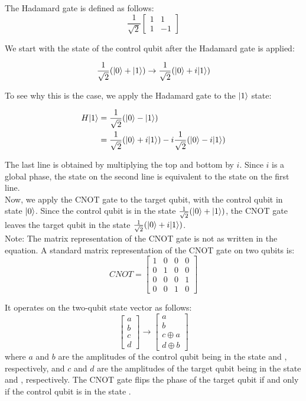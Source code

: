 \documentclass{article}
\begin{document}
	The Hadamard gate is defined as follows:
	\[
    \frac{1}{\sqrt{2}} \begin{bmatrix}
	1 & 1 \\
	1 & -1
	\end{bmatrix}
    \]

	We start with the state of the control qubit after the Hadamard gate is applied:
	
	\begin{align*}
		\frac{1}{\sqrt{2}}( |0\rangle  +  |1\rangle ) \rightarrow \frac{1}{\sqrt{2}}( |0\rangle  + i |1\rangle )
	\end{align*}
	
	To see why this is the case, we apply the Hadamard gate to the $ |1\rangle $ state:
	
	\begin{align*}
		H |1\rangle  &= \frac{1}{\sqrt{2}}( |0\rangle  -  |1\rangle ) \\
		&= \frac{1}{\sqrt{2}}( |0\rangle  + i |1\rangle ) - i\frac{1}{\sqrt{2}}( |0\rangle  - i |1\rangle )
	\end{align*}
	
	The last line is obtained by multiplying the top and bottom by $i$. Since $i$ is a global phase, the state on the second line is equivalent to the state on the first line. \\
	
	Now, we apply the CNOT gate to the target qubit, with the control qubit in state $ |0\rangle $. Since the control qubit is in the state $\frac{1}{\sqrt{2}}( |0\rangle  +  |1\rangle )$, the CNOT gate leaves the target qubit in the state $\frac{1}{\sqrt{2}}( |0\rangle  + i |1\rangle )$. \\
	
	Note: The matrix representation of the CNOT gate is not as written in the equation. A standard matrix representation of the CNOT gate on two qubits is: \\
	\[
	CNOT 
	= 
	\begin{bmatrix} 
		1 & 0 & 0 & 0 \\ 
		0 & 1 & 0 & 0 \\ 
		0 & 0 & 0 & 1 \\ 
		0 & 0 & 1 & 0 
	\end{bmatrix}
	\]
	
	It operates on the two-qubit state vector as follows:
	\[        
	\begin{bmatrix} 
		a \\ 
		b \\ 
		c \\ 
		d 
	\end{bmatrix} 
	\rightarrow 
	\begin{bmatrix} 
		a \\
		b \\ 
		c \oplus a \\ 
		d \oplus b 
	\end{bmatrix}
	\]
	where \( a \) and \( b \) are the amplitudes of the control qubit being in the state  and , respectively, and \( c \) and \( d \) are the amplitudes of the target qubit being in the state  and , respectively. 
	The CNOT gate flips the phase of the target qubit if and only if the control qubit is in the state .
	
\end{document}
